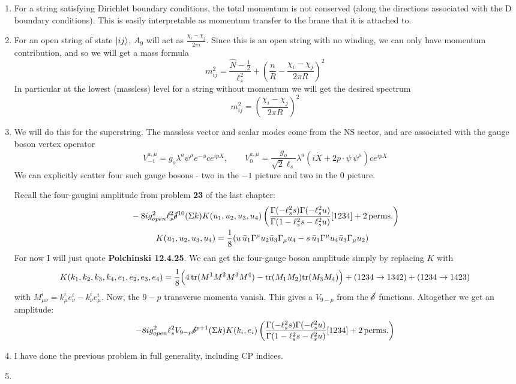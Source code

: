 \documentclass[11pt, class=article, crop=false]{standalone}
\begin{document}
\begin{enumerate}
	
	\item For a string satisfying Dirichlet boundary conditions, the total momentum is not conserved (along the directions associated with the D boundary conditions). This is easily interpretable as momentum transfer to the brane that it is attached to.
	
	\item For an open string of state $\ket{ij}$, $A_9$ will act as $\frac{\chi_i - \chi_j}{2\pi i}$. Since this is an open string with no winding, we can only have momentum contribution, and so we will get a mass formula
	\[
		m^2_{ij} = \frac{\hat N - \frac12}{\ell_s^2} + \left(\frac{n}{R} - \frac{\chi_i - \chi_j}{2\pi R} \right)^2
	\]
	In particular at the lowest (massless) level for a string without momentum we will get the desired spectrum
	\[
		m_{ij}^2 =  \left(\frac{\chi_i - \chi_j}{2\pi R} \right)^2
	\]
	
	\item We will do this for the superstring. The massless vector and scalar modes come from the NS sector, and are associated with the gauge boson vertex operator 
	\[
		V_{-1}^{a, \mu} = g_o \lambda^a \psi^\mu e^{-\phi} c e^{i p X}, \qquad
		V_{0}^{a, \mu} = \frac{g_o}{\sqrt 2 \ell_s} \lambda^a (i \dot X + 2 p \cdot \psi \, \psi^\mu) c e^{i p X}
	\]
	We can explicitly scatter four such gauge bosons - two in the $-1$ picture and two in the $0$ picture. 
	
	Recall the four-gaugini amplitude from problem \textbf{23} of the last chapter:
	\[
	\begin{aligned}
		&-8 i g_{open}^2 \ell_s^2 \cancel\delta^{10}(\Sigma k) K(u_1, u_2, u_3, u_4) \left( \frac{\Gamma(-\ell_s^2 s) \Gamma(-\ell_s^2 u)}{\Gamma(1 - \ell_s^2 s - \ell_s^2 u)} [1234] + 2 \,\mathrm{perms.} \right)\\
		& \qquad \quad K(u_1, u_2, u_3, u_4) = \frac18 (u \, \bar u_1\Gamma^\mu u_2 \bar u_3 \Gamma_\mu u_4 - s\, \bar u_1 \Gamma^\mu u_4 \bar u_3 \Gamma_\mu u_2)
	\end{aligned}
	\]
	For now I will just quote \textbf{Polchinski 12.4.25}.
	We can get the four-gauge boson amplitude simply by replacing $K$ with
	\[
		K(k_1, k_2, k_3, k_4, e_1, e_2, e_3, e_4) = \frac18 \Big(4\, \mathrm{tr}( M^1 M^2 M^3 M^4) - \mathrm{tr}(M_1 M_2) \mathrm{tr}(M_3 M_4)\Big) + (1234 \to 1342) + (1234 \to 1423)
	\]
	with $M^i_{\mu \nu} = k_\mu^i e^i_\nu - k^i_\nu e^i_\mu$. Now, the $9-p$ transverse momenta vanish. This gives a $V_{9-p}$ from the $\cancel\delta$ functions. Altogether we get an amplitude:
	\[
		-8 i g_{open}^2 \ell_s^2 V_{9-p} \cancel\delta^{p+1}(\Sigma k) K(k_i, e_i) \left( \frac{\Gamma(-\ell_s^2 s) \Gamma(-\ell_s^2 u)}{\Gamma(1 - \ell_s^2 s - \ell_s^2 u)} [1234] + 2 \,\mathrm{perms.} \right)
	\]
	
	
	\item I have done the previous problem in full generality, including CP indices.
	
	\item 
	
	
\end{enumerate}

\end{document}
